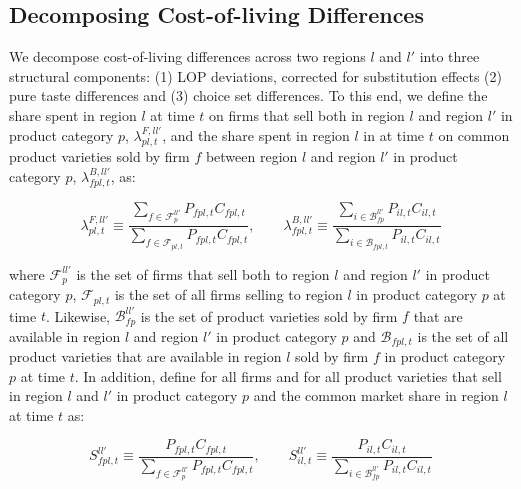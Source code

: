 \subsection{Decomposing Cost-of-living Differences}
We decompose cost-of-living differences across two regions $l$ and $l'$ into three structural components: (1) LOP deviations, corrected for substitution effects (2) pure taste differences and (3) choice set differences. To this end, we define the share spent in region $l$ at time $t$ on firms that sell both in region $l$ and region $l'$ in product category $p$, $\lambda^{F,ll'}_{pl,t}$, and the share spent in region $l$ in at time $t$ on common product varieties sold by firm $f$ between region $l$ and region $l'$ in product category $p$, $\lambda^{B,ll'}_{fpl,t}$, as: 
\begin{linenomath*}
    \begin{equation*}
        \lambda^{F,ll'}_{pl,t} \equiv  
            \frac{\sum_{f \in \mathcal{F}^{ll'}_p}P_{fpl,t}C_{fpl,t}}
                 {\sum_{f \in \mathcal{F}_{pl,t}} P_{fpl,t}C_{fpl,t}}, \qquad 
        \lambda^{B,ll'}_{fpl,t} \equiv  
                 \frac{\sum_{i \in \mathcal{B}^{ll'}_{fp}}P_{il,t}C_{il,t}}
                      {\sum_{i \in \mathcal{B}_{fpl,t}} P_{il,t}C_{il,t}}
    \end{equation*}
\end{linenomath*}
\noindent where $\mathcal{F}^{ll'}_p$ is the set of firms that sell both to region $l$ and region $l'$ in product category $p$, $\mathcal{F}_{pl,t}$ is the set of all firms selling to region $l$ in product category $p$ at time $t$. Likewise, $\mathcal{B}^{ll'}_{fp}$ is the set of product varieties sold by firm $f$ that are available in region $l$ and region $l'$ in product category $p$ and $\mathcal{B}_{fpl,t}$ is the set of all product varieties that are available in region $l$ sold by firm $f$ in product category $p$ at time $t$. In addition, define for all firms and for all product varieties that sell in region $l$ and $l'$ in product category $p$ and the common market share in region $l$ at time $t$ as: 
\begin{linenomath*}
    \begin{equation*}
        S^{ll'}_{fpl,t} \equiv  
            \frac{P_{fpl,t}C_{fpl,t}}
                 {\sum_{f \in \mathcal{F}^{ll'}_{p}} P_{fpl,t}C_{fpl,t}}, \qquad 
        S^{ll'}_{il,t} \equiv  
                 \frac{P_{il,t}C_{il,t}}
                      {\sum_{i \in \mathcal{B}^{ll'}_{fp}} P_{il,t}C_{il,t}}
    \end{equation*}
\end{linenomath*}
